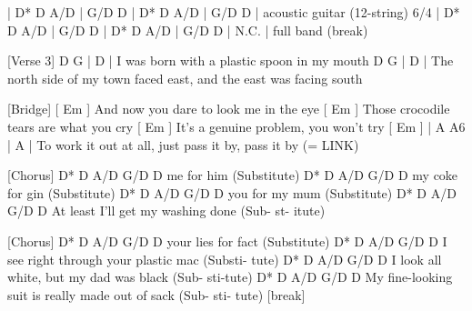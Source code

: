 \begin{lstsong}
[Interlude]
| D* D A/D   | G/D D | D* D A/D   | G/D D |
  acoustic guitar (12-string)                6/4
| D* D A/D   | G/D D | D* D A/D   | G/D D |  N.C. |
 full band                             (break)
 
[Verse 3]
D                  G               |  D  |  %
 I was born with a plastic spoon in my mouth
    D                     G                            |  D  |  %
The north side of my town faced east, and the east was facing south
 
[Bridge]
           [ Em ]
And now you dare to look me in the eye
     [ Em ]
Those crocodile tears are what you cry
      [ Em ]
It's a genuine problem, you won't try
  [ Em ]                                      |  A    A6 |  A  |
To work it out at all, just pass it by, pass it by  (= LINK)
 
[Chorus]
 D* D  A/D     G/D    D
               me for him
(Substitute)
D* D  A/D       G/D      D
             my coke for gin
(Substitute)
D* D  A/D       G/D    D
            you for my mum
(Substitute)
   D*    D     A/D   G/D     D
At least I'll get my washing done
  (Sub-  st-  itute)
 
[Chorus]
D* D  A/D         G/D      D
             your lies for fact
(Substitute)
  D*  D     A/D          G/D     D
I see right through your plastic mac
 (Substi-   tute)
  D*   D   A/D           G/D     D
I look all white, but my dad was black
 (Sub- sti-tute)
   D*   D       A/D            G/D         D
My fine-looking suit is really made out of sack
  (Sub- sti-    tute)                   [break]
\end{lstsong}

